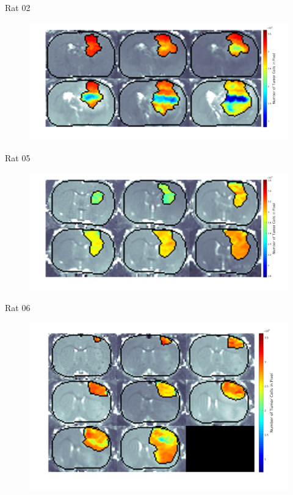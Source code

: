 \documentclass{beamer}
\begin{document}
\begin{frame}{Rat 02}
    \begin{minipage}[t][.7\textheight][t]{\textwidth}
    	\begin{figure}
    	\centering
    	\includegraphics[width=.9\textwidth]{../../mouse-data/images/Montage02.png}
    	\end{figure}
	\end{minipage}  
\end{frame}

\begin{frame}{Rat 05}
    \begin{minipage}[t][.7\textheight][t]{\textwidth}
    	\begin{figure}
    	\centering
    	\includegraphics[width=.9\textwidth]{../../mouse-data/images/Montage05.png}
    	\end{figure}
	\end{minipage}  
\end{frame}

\begin{frame}{Rat 06}
    \begin{minipage}[t][.7\textheight][t]{\textwidth}
    	\begin{figure}
    	\centering
    	\includegraphics[width=.9\textwidth]{../../mouse-data/images/Montage06.png}
    	\end{figure}
	\end{minipage}  
\end{frame}
\end{document}
